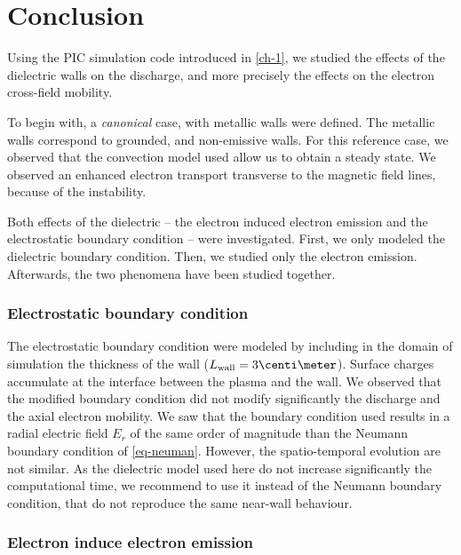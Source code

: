 
\section{Conclusion}
  \label{sec-conclusion_ch2}
  
  Using the \ac{PIC} simulation code introduced in \vref{ch-1}, we studied the effects of the dielectric walls on the discharge, and more precisely the effects on the electron cross-field mobility.
  
  To begin with, a \emph{canonical} case, with metallic walls were defined.
  The metallic walls correspond to grounded, and non-emissive walls.
  For this reference case, we observed that the convection model used allow us to obtain a steady state.
  We observed an enhanced electron transport transverse to the magnetic field lines, because of the instability.
  
  Both effects of the dielectric -- the electron induced electron emission and the electrostatic boundary condition -- were investigated.
  First, we  only modeled the dielectric boundary condition. Then, we studied only the electron emission. Afterwards, the two phenomena have been studied together.
  
  \subsubsection*{Electrostatic boundary condition}
  
  The electrostatic boundary condition were modeled by including in the domain of simulation the thickness of the wall ($L_{\rm wall} = 3 \centi\meter$).
  Surface charges accumulate at the interface between the plasma and the wall.
  We observed that the modified boundary condition did not modify significantly the discharge and the axial electron mobility.
  We saw that the boundary condition used results in a radial electric field $E_r$ of the same order of magnitude than the Neumann boundary condition of \vref{eq-neuman}.
  However, the spatio-temporal evolution are not similar.
  As the dielectric model used here do not increase significantly the computational time, we recommend to use it instead of the Neumann boundary condition, that do not reproduce the same near-wall behaviour.
  
  
  \subsubsection*{Electron induce electron emission}
  
